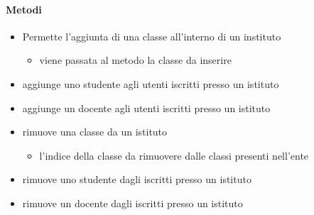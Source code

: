 \paragraph{Metodi}
\begin{itemize}
\item {}
\newline
Permette l'aggiunta di una classe all'interno di un instituto
\newline
{}
\newline
\begin{itemize}
\item {}
\newline
viene passata al metodo la classe da inserire
\end{itemize}
\item {}
\newline
aggiunge uno studente agli utenti iscritti presso un istituto
\newline
\item {}
\newline
aggiunge un docente agli utenti iscritti presso un istituto
\newline
\item {}
\newline
rimuove una classe da un istituto
\newline
{}
\newline
\begin{itemize}
\item {}
\newline
l'indice della classe da rimuovere dalle classi presenti nell'ente
\end{itemize}
\item {}
\newline
rimuove uno studente dagli iscritti presso un istituto
\newline
\item {}
\newline
rimuove un docente dagli iscritti presso un istituto
\newline
\end{itemize}
